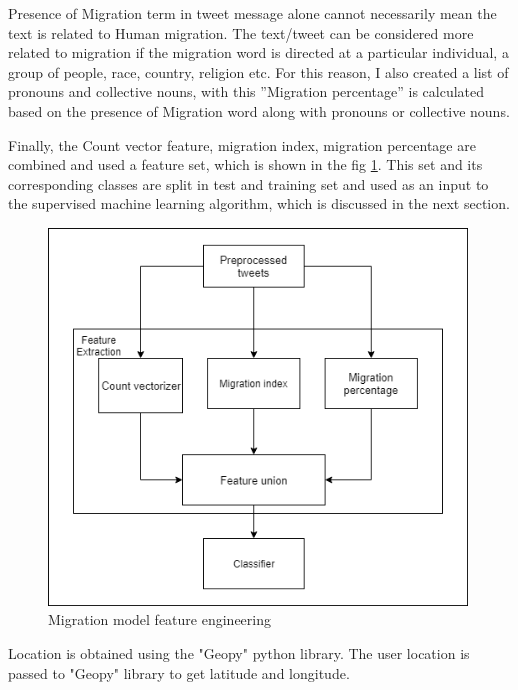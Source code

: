 Presence of Migration term in tweet message alone cannot necessarily mean the text is related
to Human migration. The text/tweet can be considered more related to migration if the migration word is directed at a particular individual, a group of
people, race, country, religion etc. For this reason, I also created a list of pronouns and collective nouns, with this ”Migration percentage” is calculated based on the presence of Migration word along with pronouns or collective nouns.




Finally, the Count vector feature, migration index, migration percentage are combined and used a feature set, which is shown in the fig \ref{fig:featureeng}. This set and its corresponding classes are split in test and training set and used as an input to the supervised machine learning algorithm, which is discussed in the next section.

\begin{figure}
    \centering
    \includegraphics[width=10cm\linewidth,height=10cm]{thesis_template/images/featureengineering.png}
    \caption{Migration model feature engineering}
    \label{fig:featureeng}
\end{figure}
    

Location is obtained using the "Geopy" python library. The user location is passed to "Geopy" library to get latitude and longitude. 



